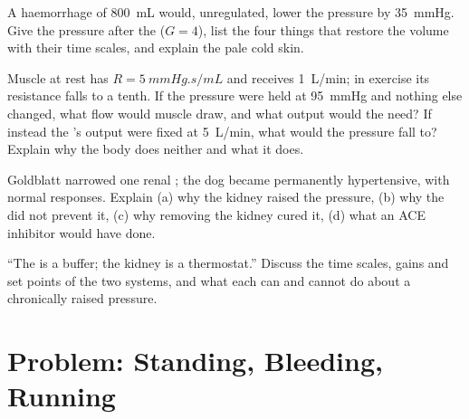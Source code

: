 \begin{exercise}[$\star\star$]\label{exo:b2:blood-pressure:9}
A haemorrhage of \qty{800}{mL} would, unregulated, lower the pressure
by \qty{35}{mmHg}. Give the pressure after the  ($G = 4$),
list the four things that restore the volume with their time
scales, and explain the pale cold skin.
\end{exercise}

\begin{exercise}[$\star\star\star$]\label{exo:b2:blood-pressure:10}
Muscle at rest has $R = \qty{5}{mmHg.s/mL}$ and receives
\qty{1}{L/min}; in exercise its resistance falls to a tenth. If the
pressure were held at \qty{95}{mmHg} and nothing else changed,
what flow would muscle draw, and what output would the  need?
If instead the 's output were fixed at \qty{5}{L/min}, what
would the pressure fall to? Explain why the body does neither and
what it does.
\end{exercise}

\begin{exercise}[$\star\star\star$]\label{exo:b2:blood-pressure:11}
Goldblatt narrowed one renal ; the dog became permanently
hypertensive, with normal  responses. Explain (a) why the
kidney raised the pressure, (b) why the  did not prevent
it, (c) why removing the kidney cured it, (d) what an ACE inhibitor
would have done.
\end{exercise}

\begin{exercise}[$\star\star\star$]\label{exo:b2:blood-pressure:12}
``The  is a buffer; the kidney is a thermostat.''
Discuss the time scales, gains and set points of the two systems,
and what each can and cannot do about a chronically raised pressure.
\end{exercise}

\section{Problem: Standing, Bleeding, Running}


